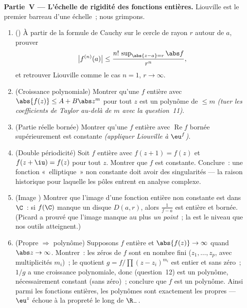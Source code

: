 \begin{problem}
\medskip
\noindent\textbf{Partie~V --- L'échelle de rigidité des
fonctions entières.} Liouville est le premier barreau d'une
échelle~; nous grimpons.
\begin{enumerate}[resume]
  \item () À partir de la formule de
        Cauchy sur le cercle de rayon $r$ autour de $a$,
        prouver
        \[
        \bigl|f^{(n)}(a)\bigr| \leq
        \frac{n!\,\sup_{\abs{z-a}=r}\abs f}{r^n} ,
        \]
        et retrouver Liouville comme le cas $n = 1$, $r \to
        \infty$.
  \item (Croissance polynomiale) Montrer qu'une $f$ entière
        avec $\abs{f(z)} \leq A + B\abs z^m$ pour tout $z$ est
        un polynôme de  $\leq m$ \emph{(tuer les
        coefficients de Taylor au-delà de $m$ avec la
        question~11)}.
  \item (Partie réelle bornée) Montrer qu'une $f$ entière avec
        $\operatorname{Re}f$ bornée supérieurement est
        constante \emph{(appliquer Liouville à $\eu^{f}$)}.
  \item (Double périodicité) Soit $f$ entière avec $f(z + 1)
        = f(z)$ et $f(z + \iu) = f(z)$ pour tout $z$. Montrer
        que $f$ est constante. Conclure~: une fonction
        «~elliptique~» non constante doit avoir des
        singularités --- la raison historique pour laquelle
        les pôles entrent en analyse complexe.
  \item (Image ) Montrer que l'image d'une fonction
        entière non constante est  dans $\C$~: si
        $f(\C)$ manque un disque $D(a, r)$, alors $\frac1{f -
        a}$ est entière et bornée. (Picard a prouvé que
        l'image manque au plus \emph{un point}~; la 
        est le niveau que nos outils atteignent.)
  \item (Propre $\Rightarrow$ polynôme) Supposons $f$ entière
        et $\abs{f(z)} \to \infty$ quand $\abs z \to \infty$.
        Montrer~: les zéros de $f$ sont en nombre fini
        ($z_1, \dots, z_p$, avec multiplicités $m_i$)~; le
        quotient $g = f/\prod(z - z_i)^{m_i}$ est entier et
        sans zéro~; $1/g$ a une croissance polynomiale, donc
        (question~12) est un polynôme, nécessairement
        constant (sans zéro)~; conclure que $f$ est un
        polynôme. Ainsi parmi les fonctions entières, les
        polynômes sont exactement les propres --- $\eu^z$
        échoue à la propreté le long de $\R_-$.
\end{enumerate}


\end{problem}
